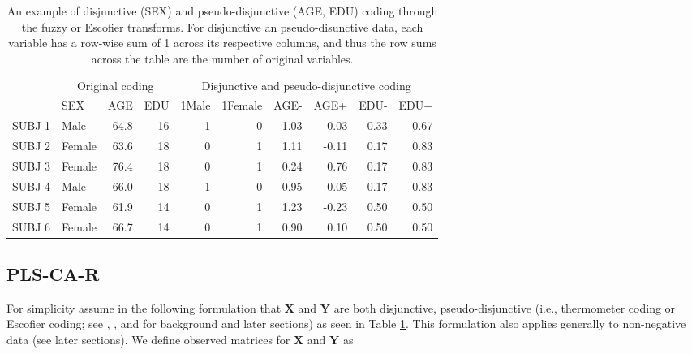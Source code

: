 \documentclass[12pt]{article}
\begin{document}
\begin{table}[!h]

\caption{\label{tab:unnamed-chunk-1}\label{table:disj} An example of disjunctive (SEX) and pseudo-disjunctive (AGE, EDU) coding through the fuzzy or Escofier transforms. For disjunctive an pseudo-disunctive data, each variable has a row-wise sum of 1 across its respective columns, and thus the row sums across the table are the number of original variables.}
\centering
\begin{tabular}{llrrrrrrrr}
\toprule
\multicolumn{1}{c}{ } & \multicolumn{3}{c}{Original coding} & \multicolumn{6}{c}{Disjunctive and pseudo-disjunctive coding} \\
\cmidrule(l{2pt}r{2pt}){2-4} \cmidrule(l{2pt}r{2pt}){5-10}
  & SEX & AGE & EDU & 1Male & 1Female & AGE- & AGE+ & EDU- & EDU+\\
\midrule
SUBJ 1 & Male & 64.8 & 16 & 1 & 0 & 1.03 & -0.03 & 0.33 & 0.67\\
SUBJ 2 & Female & 63.6 & 18 & 0 & 1 & 1.11 & -0.11 & 0.17 & 0.83\\
SUBJ 3 & Female & 76.4 & 18 & 0 & 1 & 0.24 & 0.76 & 0.17 & 0.83\\
SUBJ 4 & Male & 66.0 & 18 & 1 & 0 & 0.95 & 0.05 & 0.17 & 0.83\\
SUBJ 5 & Female & 61.9 & 14 & 0 & 1 & 1.23 & -0.23 & 0.50 & 0.50\\
\addlinespace
SUBJ 6 & Female & 66.7 & 14 & 0 & 1 & 0.90 & 0.10 & 0.50 & 0.50\\
\bottomrule
\end{tabular}
\end{table}

\hypertarget{pls-ca-r}{%
\subsection{PLS-CA-R}\label{pls-ca-r}}

\label{section:plscar_form}

For simplicity assume in the following formulation that \({\mathbf X}\)
and \({\mathbf Y}\) are both disjunctive, pseudo-disjunctive (i.e.,
thermometer coding or Escofier coding; see
\citet{escofier_traitement_1979}, \citet{beaton_partial_2016}, and
\citet{beaton2018generalization} for background and later sections) as
seen in Table \ref{table:disj}. This formulation also applies generally
to non-negative data (see later sections). We define observed matrices
for \({\mathbf X}\) and \({\mathbf Y}\) as
\end{document}
